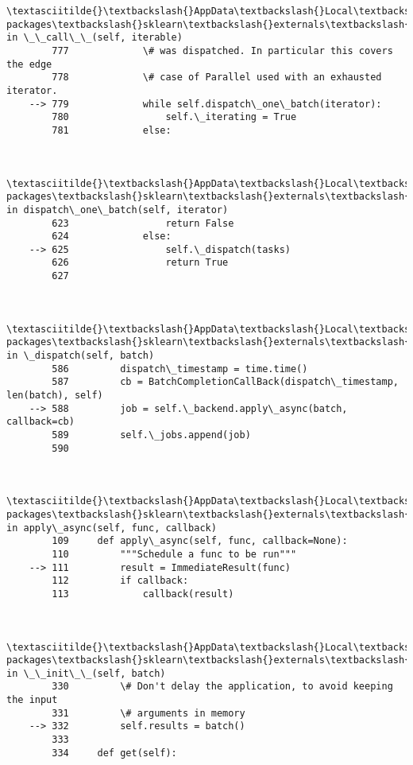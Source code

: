 \documentclass[11pt]{article}
\begin{document}
\begin{Verbatim}[commandchars=\\\{\}]
        \textasciitilde{}\textbackslash{}AppData\textbackslash{}Local\textbackslash{}Continuum\textbackslash{}anaconda3\textbackslash{}lib\textbackslash{}site-packages\textbackslash{}sklearn\textbackslash{}externals\textbackslash{}joblib\textbackslash{}parallel.py in \_\_call\_\_(self, iterable)
        777             \# was dispatched. In particular this covers the edge
        778             \# case of Parallel used with an exhausted iterator.
    --> 779             while self.dispatch\_one\_batch(iterator):
        780                 self.\_iterating = True
        781             else:
    

        \textasciitilde{}\textbackslash{}AppData\textbackslash{}Local\textbackslash{}Continuum\textbackslash{}anaconda3\textbackslash{}lib\textbackslash{}site-packages\textbackslash{}sklearn\textbackslash{}externals\textbackslash{}joblib\textbackslash{}parallel.py in dispatch\_one\_batch(self, iterator)
        623                 return False
        624             else:
    --> 625                 self.\_dispatch(tasks)
        626                 return True
        627 
    

        \textasciitilde{}\textbackslash{}AppData\textbackslash{}Local\textbackslash{}Continuum\textbackslash{}anaconda3\textbackslash{}lib\textbackslash{}site-packages\textbackslash{}sklearn\textbackslash{}externals\textbackslash{}joblib\textbackslash{}parallel.py in \_dispatch(self, batch)
        586         dispatch\_timestamp = time.time()
        587         cb = BatchCompletionCallBack(dispatch\_timestamp, len(batch), self)
    --> 588         job = self.\_backend.apply\_async(batch, callback=cb)
        589         self.\_jobs.append(job)
        590 
    

        \textasciitilde{}\textbackslash{}AppData\textbackslash{}Local\textbackslash{}Continuum\textbackslash{}anaconda3\textbackslash{}lib\textbackslash{}site-packages\textbackslash{}sklearn\textbackslash{}externals\textbackslash{}joblib\textbackslash{}\_parallel\_backends.py in apply\_async(self, func, callback)
        109     def apply\_async(self, func, callback=None):
        110         """Schedule a func to be run"""
    --> 111         result = ImmediateResult(func)
        112         if callback:
        113             callback(result)
    

        \textasciitilde{}\textbackslash{}AppData\textbackslash{}Local\textbackslash{}Continuum\textbackslash{}anaconda3\textbackslash{}lib\textbackslash{}site-packages\textbackslash{}sklearn\textbackslash{}externals\textbackslash{}joblib\textbackslash{}\_parallel\_backends.py in \_\_init\_\_(self, batch)
        330         \# Don't delay the application, to avoid keeping the input
        331         \# arguments in memory
    --> 332         self.results = batch()
        333 
        334     def get(self):
    


\end{Verbatim}
\end{document}
